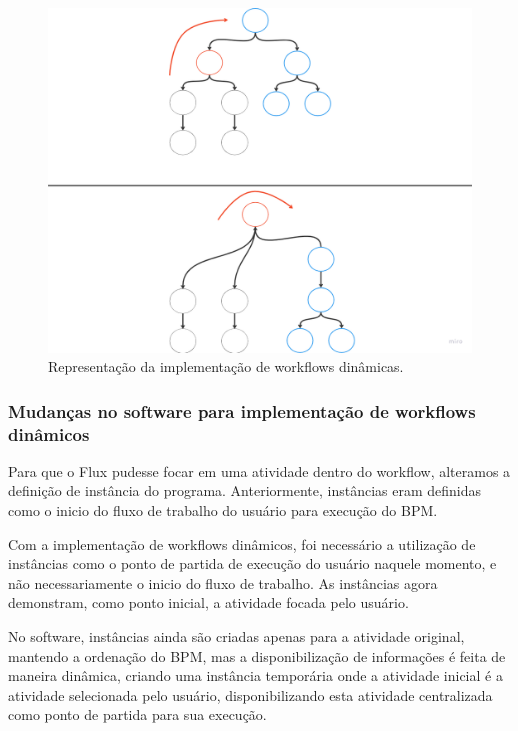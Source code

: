 \begin{figure}
    \centering
    \includegraphics[width=1\textwidth]{imgs/Implementacoes/primeiraImplementacao.png}
    \caption{Representação da implementação de workflows dinâmicas.}
    \label{fig:primeira_implementacao}
\end{figure}

\subsubsection{Mudanças no software para implementação de workflows dinâmicos}

Para que o Flux pudesse focar em uma atividade dentro do workflow, alteramos a definição de instância do programa. Anteriormente, instâncias eram definidas como o inicio do fluxo de trabalho do usuário para execução do BPM.

Com a implementação de workflows dinâmicos, foi necessário a utilização de instâncias como o ponto de partida de execução do usuário naquele momento, e não necessariamente o inicio do fluxo de trabalho. As instâncias agora demonstram, como ponto inicial, a atividade focada pelo usuário.

No software, instâncias ainda são criadas apenas para a atividade original, mantendo a ordenação do BPM, mas a disponibilização de informações é feita de maneira dinâmica, criando uma instância temporária onde a atividade inicial é a atividade selecionada pelo usuário, disponibilizando esta atividade centralizada como ponto de partida para sua execução.

